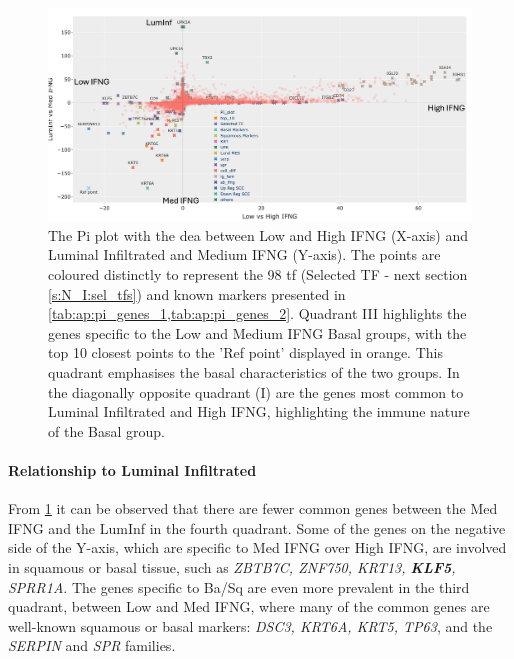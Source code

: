 \begin{figure}[!htb]    
    \centering
    \includegraphics[width=1.0\textwidth,keepaspectratio]{Sections/ClusteringAnalysis/Resources/discussion/basal_inf_pi.png}
    \caption{The Pi plot with the \acrshort{dea} between Low and High IFNG (X-axis) and Luminal Infiltrated and Medium IFNG (Y-axis). The points are coloured distinctly to represent the 98 \acrlong{tf} (Selected TF - next section \cref{s:N_I:sel_tfs}) and known markers presented in \cref{tab:ap:pi_genes_1,tab:ap:pi_genes_2}. Quadrant III highlights the genes specific to the Low and Medium IFNG Basal groups, with the top 10 closest points to the 'Ref point' displayed in orange. This quadrant emphasises the basal characteristics of the two groups. In the diagonally opposite quadrant (I) are the genes most common to Luminal Infiltrated and High IFNG, highlighting the immune nature of the Basal group.}
    \label{fig:cs:pi_basal_inf}
\end{figure}


\paragraph*{Relationship to Luminal Infiltrated}

From \cref{fig:cs:pi_basal_inf} it can be observed that there are fewer common genes between the Med IFNG and the LumInf in the fourth quadrant. Some of the genes on the negative side of the Y-axis, which are specific to Med IFNG over High IFNG, are involved in squamous or basal tissue, such as \textit{ZBTB7C, ZNF750, KRT13, \textbf{KLF5}, SPRR1A}. The genes specific to Ba/Sq are even more prevalent in the third quadrant, between Low and Med IFNG, where many of the common genes are well-known squamous or basal markers: \textit{DSC3, KRT6A, KRT5, TP63}, and the \textit{SERPIN} and \textit{SPR} families.


